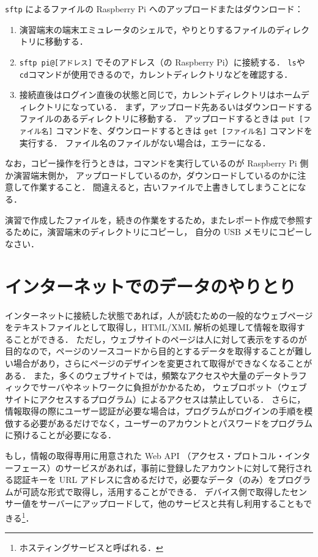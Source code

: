 \documentclass[11pt,a4,epsf]{article}
\begin{document}
\verb+sftp+ によるファイルの Raspberry Pi へのアップロードまたはダウンロード：
\begin{enumerate}
\item
演習端末の端末エミュレータのシェルで，やりとりするファイルのディレクトリに移動する．
\item
\verb+sftp pi@[アドレス]+ でそのアドレス（の Raspberry Pi）に接続する．
\verb+ls+や\verb+cd+コマンドが使用できるので，カレントディレクトリなどを確認する．
\item
接続直後はログイン直後の状態と同じで，カレントディレクトリはホームディレクトリになっている．
まず，アップロード先あるいはダウンロードするファイルのあるディレクトリに移動する．
アップロードするときは \verb+put [ファイル名]+ コマンドを、ダウンロードするときは \verb+get [ファイル名]+ コマンドを実行する．
ファイル名のファイルがない場合は，エラーになる．
\end{enumerate}

なお，コピー操作を行うときは，コマンドを実行しているのが Raspberry Pi 側か演習端末側か，
アップロードしているのか，ダウンロードしているのかに注意して作業すること．
間違えると，古いファイルで上書きしてしまうことになる．

\begin{excercise}
演習で作成したファイルを，続きの作業をするため，またレポート作成で参照するために，演習端末のディレクトリにコピーし，
自分の USB メモリにコピーしなさい．
\end{excercise}

\section{インターネットでのデータのやりとり}

インターネットに接続した状態であれば，人が読むための一般的なウェブページをテキストファイルとして取得し，HTML/XML 解析の処理して情報を取得することができる．
ただし，ウェブサイトのページは人に対して表示をするのが目的なので，ページのソースコードから目的とするデータを取得することが難しい場合があり，さらにページのデザインを変更されて取得ができなくなることがある．
また，多くのウェブサイトでは，頻繁なアクセスや大量のデータトラフィックでサーバやネットワークに負担がかかるため，
ウェブロボット（ウェブサイトにアクセスするプログラム）によるアクセスは禁止している．
さらに，情報取得の際にユーザー認証が必要な場合は，プログラムがログインの手順を模倣する必要があるだけでなく，ユーザーのアカウントとパスワードをプログラムに預けることが必要になる．

もし，情報の取得専用に用意された Web API （アクセス・プロトコル・インターフェース）のサービスがあれば，事前に登録したアカウントに対して発行される認証キーを URL アドレスに含めるだけで，必要なデータ（のみ）をプログラムが可読な形式で取得し，活用することができる．
デバイス側で取得したセンサー値をサーバーにアップロードして，他のサービスと共有し利用することもできる\footnote{ホスティングサービスと呼ばれる．}．
\end{document}
